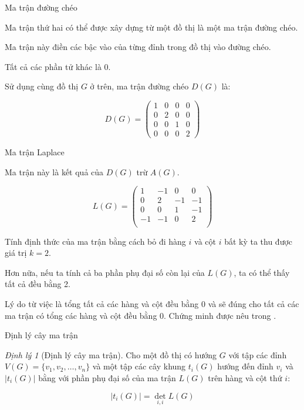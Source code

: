 \documentclass[10pt]{beamer}
\theoremstyle{remark}
\newtheorem{dl}{Định lý}
\numberwithin{algocf}{section}
\numberwithin{equation}{section}
\numberwithin{dl}{section}
\numberwithin{figure}{section}
\begin{document}
\begin{frame}{Ma trận đường chéo}

    Ma trận thứ hai có thể được xây dựng từ một đồ thị là một ma trận đường chéo.

    Ma trận này điền các bậc vào của từng đỉnh trong đồ thị vào đường chéo.

    Tất cả các phần tử khác là 0.

    Sử dụng cùng đồ thị $G$ ở trên, ma trận đường chéo $D(G)$ là:

    \begin{equation*}
        D(G) = \begin{pmatrix}
            1 & 0 & 0 & 0 \\
            0 & 2 & 0 & 0 \\
            0 & 0 & 1 & 0 \\
            0 & 0 & 0 & 2
        \end{pmatrix}
    \end{equation*} 
    
\end{frame}

\begin{frame}{Ma trận Laplace}

    Ma trận này là kết quả của $D(G)$ trừ $A(G)$.

    \begin{equation*}
        L(G) = \begin{pmatrix}
            1 & -1 & 0 & 0 \\
            0 & 2 & -1 & -1 \\
            0 & 0 & 1 & -1 \\
            -1 & -1 & 0 & 2 \\
        \end{pmatrix}
    \end{equation*}

    Tính định thức của ma trận bằng cách bỏ đi hàng $i$ và cột $i$ bất kỳ ta thu được giá trị $k=2$.

    Hơn nữa, nếu ta tính cả ba phần phụ đại số còn lại của $L(G)$, ta có thể thấy tất cả đều bằng 2.

    Lý do từ việc là tổng tất cả các hàng và cột đều bằng 0 và sẽ đúng cho tất cả các ma trận có tổng các hàng và cột đều bằng 0.
    Chứng minh được nêu trong \cite{fleischner1990eulerian}.
\end{frame}

\begin{frame}{Định lý cây ma trận}
    \begin{dl}[Định lý cây ma trận]
        Cho một đồ thị có hướng $G$ với tập các đỉnh $V(G)=\lbrace v_1, v_2, \dots, v_n \rbrace$ và một tập các cây khung $t_i (G)$ hướng đến đỉnh $v_i$ và $\lvert t_i(G) \rvert$ bằng với phần phụ đại số của ma trận $L(G)$ trên hàng và cột thứ $i$:

        \begin{equation*}
            \lvert t_i(G) \rvert = \det_{i, i} L(G)
        \end{equation*}
    \end{dl}
\end{frame}
\end{document}
